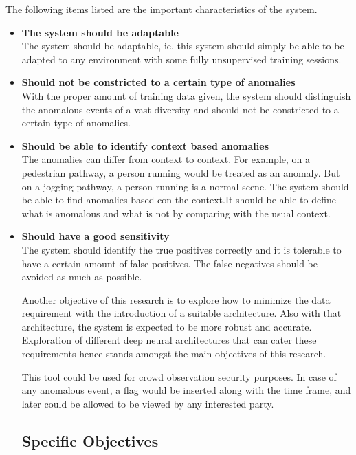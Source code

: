 \documentclass[a4paper,12pt]{report}
\begin{document}
The following items listed are the important characteristics of the system.
\begin{itemize}
    \item \textbf{The system should be adaptable} \\
    The system should be adaptable, ie. this system should simply be able to be adapted to any environment with some fully unsupervised training sessions.
    
    \item \textbf{Should not be constricted to a certain type of anomalies} \\
    With the proper amount of training data given, the system should distinguish the anomalous events of a vast diversity and should  not be constricted to a certain type of anomalies.
    
    \item \textbf{Should be able to identify context based anomalies} \\
     The anomalies can differ from context to context. For example, on a pedestrian pathway, a person running would be treated as an anomaly. But on a jogging pathway, a person running is a normal scene. The system should be able to find anomalies based con the context.It should be able to define what is anomalous and what is not by comparing with the usual context.
     
     \item \textbf{Should have a good sensitivity} \\
     The system should identify the true positives correctly and it is tolerable to have a certain amount of false positives. The false negatives should be avoided as much as possible.
     
Another objective of this research is to explore how to minimize the data requirement with the introduction of a suitable architecture. Also with that architecture, the system is expected to be more robust and accurate. Exploration of different deep neural architectures that can cater these requirements hence stands amongst the main objectives of this research. 

This tool could be used for crowd observation security purposes. In case of any anomalous event, a flag would be inserted along with the time frame, and later could be allowed to be viewed by any interested party. 

\subsection{Specific Objectives}


\end{itemize}
\end{document}
